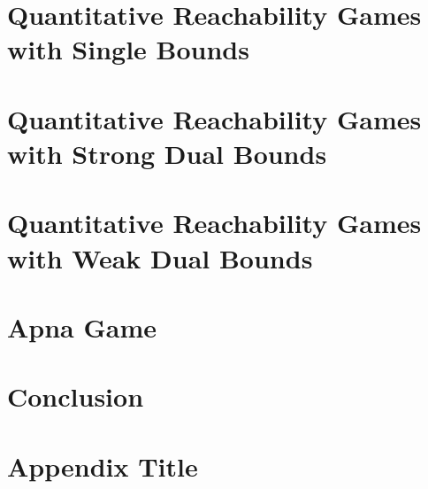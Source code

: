 \documentclass[a4paper, 12pt, twoside]{book}
\theoremstyle{definition}
\begin{document}
\chapter{Quantitative Reachability Games with Single Bounds}

 
\chapter{Quantitative Reachability Games with Strong Dual Bounds}


\chapter{Quantitative Reachability Games with Weak Dual Bounds}

 
\chapter{Apna Game}


\chapter{Conclusion}





\appendix
\chapter{Appendix Title}

\end{document}
